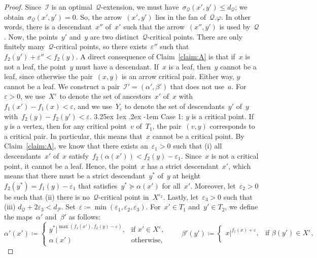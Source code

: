 \documentclass[11pt]{article}
\makeatletter
\newcommand{\an}[2]{#1|^{#2}}
\newcommand{\shift}[1]{\sigma_{#1}}
\newcommand{\resdist}[1]{d_{#1}}
\newcommand{\eps}{\varepsilon}
\renewcommand{\phi}{\varphi}
\newcommand{\I}{\mathcal{I}}
\renewcommand{\P}{\mathcal{P}}
\newcommand{\Q}{\mathcal{Q}}
\newcommand{\proofsubparagraph}{\@startsection{subparagraph}{5}{\z@}%
                                       {3.25ex \@plus1ex \@minus .2ex}%
                                       {-1em}%
                                      {\color{lipicsGray}\sffamily\normalsize\bfseries}}
\newenvironment{claimproof}[1][\proofname]{
  \pushQED{\qed}%
  \normalfont \topsep6\p@\@plus6\p@\relax
  \trivlist
  \item[\hskip\labelsep
        \color{lipicsGray}\sffamily
    #1\@addpunct{.}]\ignorespaces
}{%
  \renewcommand\qedsymbol{\textcolor{lipicsGray}{\ensuremath{\vartriangleleft}}}
  \popQED\endtrivlist%
  \renewcommand\qedsymbol{\textcolor{lipicsGray}{\ensuremath{\blacktriangleleft}}}
}
\makeatother
\begin{document}
\begin{proof}
\begin{claimproof}
    Since~$\I$ is an optimal~$\Q$-extension, we must have~$\shift{\Q}(x', y') \le \resdist{\Q}$; we obtain~$\shift{\Q}(x', y') = 0$.
    So, the arrow~$(x', y')$ lies in the fan of~$\Q.\phi$.
    In other words, there is a descendant~$x''$ of~$x'$ such that the arrow~$(x'', y')$ is used by~$\Q$.
    Now, the points~$y'$ and~$y$ are two distinct~$\Q$-critical points.
    There are only finitely many~$\Q$-critical points, so there exists~$\eps''$ such that~$f_2(y') + \eps'' < f_2(y)$.
    \end{claimproof}
%
    \noindent
    A direct consequence of Claim~\ref{claim:A} is that if~$x$ is not a leaf, the point~$y$ must have a descendant.
    If~$x$ is a leaf, then~$y$ cannot be a leaf, since otherwise the pair~$(x, y)$ is an arrow critical pair.
    Either way, $y$ cannot be a leaf.
    We construct a pair~$\I' = (\alpha', \beta')$ that does not use~$a$.
    For~$\eps > 0$, we use~$X^\eps$ to denote the set of ancestors~$x'$ of~$x$ with~$f_1(x') - f_1(x) < \eps$, and we use~$Y_\eps$ to denote the set of descendants~$y'$ of~$y$ with~$f_2(y) - f_2(y') < \eps$.
%
    \proofsubparagraph{Case 1: $y$ is a critical point.}
    If~$y$ is a vertex, then for any critical point~$v$ of~$T_1$, the pair~$(v, y)$ corresponds to a critical pair.
    In particular, this means that~$x$ cannot be a critical point.
    By Claim~\ref{claim:A}, we know that there exists an~$\eps_1 > 0$ such that (i) all descendants~$x'$ of~$x$ satisfy~$f_2(\alpha(x')) < f_2(y) - \eps_1$.
    Since~$x$ is not a critical point, it cannot be a leaf.
    Hence, the point~$x$ has a strict descendant~$x'$, which means that there must be a strict descendant~$y^*$ of~$y$ at height~$f_2(y^*) = f_1(y) - \eps_1$ that satisfies~$y^* \succeq \alpha(x')$ for all~$x'$.
    Moreover, let~$\eps_2 > 0$ be such that (ii) there is no~$\Q$-critical point in~$X^{\eps_2}$.
    Lastly, let~$\eps_3 > 0$ such that (iii) $\resdist{\Q} + 2\eps_3 < \resdist{\P}$.
    Set~$\eps \coloneqq \min(\eps_1, \eps_2, \eps_3)$.
    For~$x' \in T_1$ and~$y' \in T_2$, we define the maps~$\alpha'$ and~$\beta'$ as follows:
    \[
        \alpha'(x') \coloneqq \begin{cases}
            \an{y^*}{\max(f_1(x'), f_2(y)-\eps)}, & \text{if } x' \in X^\eps, \\
            \alpha(x') & \text{otherwise,}
        \end{cases} \qquad
        \beta'(y') \coloneqq \begin{cases}
            \an{x}{f_1(x) + \eps}, & \text{if } \beta(y') \in X^\eps, \\

\end{cases}\]
\end{proof}
\end{document}
